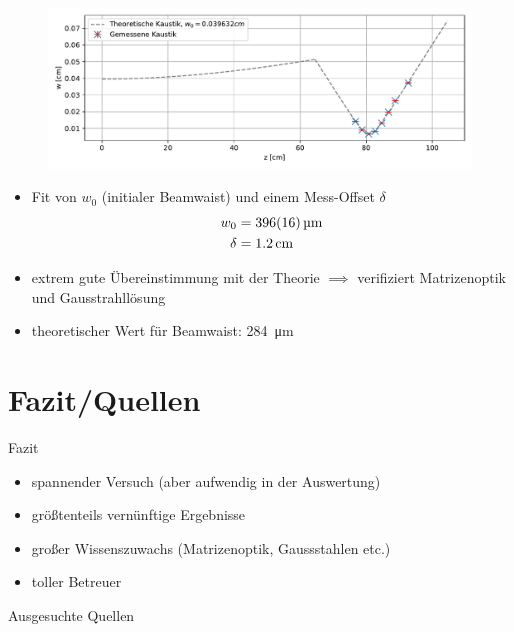 \documentclass[10pt, aspectratio=169]{beamer}
\begin{document}
\begin{frame}
  \begin{figure}[b]\centering
    \includegraphics[width=.8\columnwidth]{figs/kaustik.pdf}
  \end{figure}
  \begin{itemize}
  \item<1-> Fit von \(w_0\) (initialer Beamwaist) und einem
    Mess-Offset \(\delta\)
    \begin{align*}
      w_0 & =\SI{396\pm 16}{\micro\meter} \\
      \delta & =\SI{1.2}{cm}
    \end{align*}
  \item<2-> extrem gute \"Ubereinstimmung mit der Theorie \(\implies\)
    verifiziert Matrizenoptik und Gausstrahll\"osung
  \item<3-> theoretischer Wert f\"ur Beamwaist: \SI{284}{\micro\meter}
  \end{itemize}
\end{frame}


\section{Fazit/Quellen}

\begin{frame}{Fazit}
  \begin{itemize}
  \item<1-> spannender Versuch (aber aufwendig in der Auswertung)
  \item<2-> gr\"o\ss{}tenteils vern\"unftige Ergebnisse
  \item<3-> gro\ss{}er Wissenszuwachs (Matrizenoptik, Gaussstahlen
    etc.)
  \item<4-> toller Betreuer
  \end{itemize}
\end{frame}

\begin{frame}[allowframebreaks]{Ausgesuchte Quellen}
  \printbibliography
\end{frame}
\end{document}
